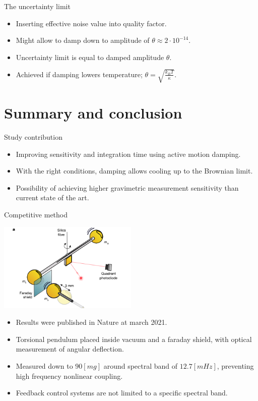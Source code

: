 \documentclass{beamer}
\begin{document}
\begin{frame}{The uncertainty limit}
	
	\begin{itemize}
		\item Inserting effective noise value into quality factor.
		\item Might allow to damp down to amplitude of $\theta\approx 2\cdot 10^{-14}$.
		\item Uncertainty limit is equal to damped amplitude $\theta$. 	
		\item Achieved if damping lowers temperature; $\theta = \sqrt{\frac{k_B T}{\kappa}}$.
				
	\end{itemize}
\end{frame}


\section{Summary and conclusion}


\begin{frame}{Study contribution}
	\begin{itemize}
		\item Improving sensitivity and integration time using active motion damping.
		\item With the right conditions, damping allows cooling up to the Brownian limit. 
		\item Possibility of achieving higher gravimetric measurement sensitivity than current state of the art.
		
	\end{itemize}
\end{frame}




\begin{frame}{Competitive method}
\begin{center}		
		\includegraphics[width=0.5\textwidth,keepaspectratio]{nature.PNG}
	\end{center}

	\begin{itemize}
		\item Results were published in Nature at march 2021.

		\item Torsional pendulum placed inside vacuum and a faraday shield, with optical measurement of angular deflection.
		\item Measured down to $90 [mg]$ around spectral band of $12.7 [mHz]$, preventing high frequency nonlinear coupling.
		\item Feedback control systems are not limited to a specific spectral band.

	\end{itemize}
\end{frame}
\end{document}
